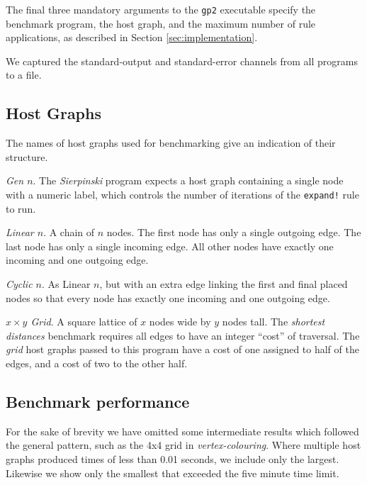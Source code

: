 The final three mandatory arguments to the \texttt{gp2} executable specify the benchmark program, the host graph, and the maximum number of rule applications, as described in Section \ref{sec:implementation}.

We captured the standard-output and standard-error channels from all programs to a file.

\subsection{Host Graphs}
\label{subsec:hosts}

The names of host graphs used for benchmarking give an indication of their structure.


\vspace{.5\baselineskip}
\noindent
\emph{Gen $n$}. The \textit{Sierpinski} program expects a host graph containing a single node with a numeric label, which controls the number of iterations of the \texttt{expand!} rule to run.

\vspace{.5\baselineskip}
\noindent
\emph{Linear $n$}. A chain of $n$ nodes. The first node has only a single outgoing edge. The last node has only a single incoming edge. All other nodes have exactly one incoming and one outgoing edge.

\vspace{.5\baselineskip}
\noindent
\emph{Cyclic $n$}. As Linear $n$, but with an extra edge linking the first and final placed nodes so that every node has exactly one incoming and one outgoing edge.

\vspace{.5\baselineskip}
\noindent
\emph{$x \times y$ Grid}. A square lattice of $x$ nodes wide by $y$ nodes tall. The \textit{shortest distances} benchmark requires all edges to have an integer ``cost'' of traversal. The \textit{grid} host graphs passed to this program have a cost of one assigned to half of the edges, and a cost of two to the other half.



\subsection{Benchmark performance}\label{sec:benchperf}

For the sake of brevity we have omitted some intermediate results which followed the general pattern, such as the 4x4 grid in \textit{vertex-colouring}. Where multiple host graphs produced times of less than 0.01 seconds, we include only the largest. Likewise we show only the smallest that exceeded the five minute time limit.



